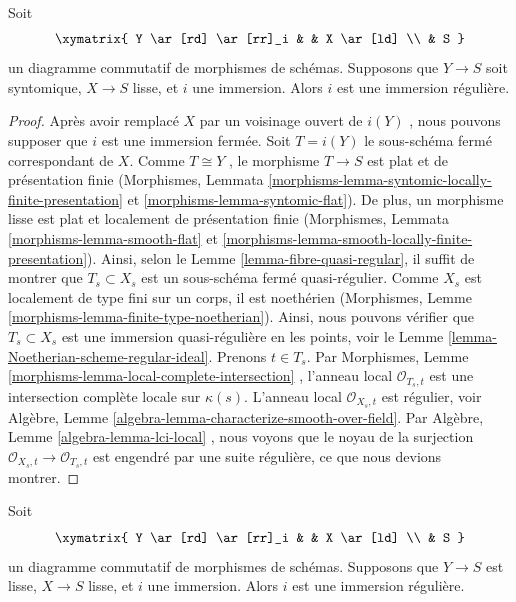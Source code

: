\begin{lemma}
\label{lemma-immersion-lci-into-smooth-regular-immersion}
Soit
$$
\xymatrix{
Y \ar[rd] \ar[rr]_i & & X \ar[ld] \\
& S
}
$$
un diagramme commutatif de morphismes de schémas. Supposons que  $Y \to S$  soit
syntomique,  $X \to S$  lisse, et  $i$  une immersion. Alors  $i$ 
est une immersion régulière.
\end{lemma}

\begin{proof}
Après avoir remplacé  $X$  par un voisinage ouvert de  $i(Y)$ , nous
pouvons supposer que  $i$  est une immersion fermée. Soit  $T = i(Y)$  le
sous-schéma fermé correspondant de  $X$. Comme  $T \cong Y$ , le morphisme
 $T \to S$  est plat et de présentation finie (Morphismes, Lemmata  \ref{morphisms-lemma-syntomic-locally-finite-presentation} 
et  \ref{morphisms-lemma-syntomic-flat}). De plus, un morphisme lisse est plat et localement de
présentation finie (Morphismes, Lemmata  \ref{morphisms-lemma-smooth-flat}  et  \ref{morphisms-lemma-smooth-locally-finite-presentation}). Ainsi,
selon le Lemme  \ref{lemma-fibre-quasi-regular}, il suffit de montrer que  $T_s \subset X_s$  est un
sous-schéma fermé quasi-régulier. Comme  $X_s$  est localement de type fini
sur un corps, il est noethérien (Morphismes, Lemme  \ref{morphisms-lemma-finite-type-noetherian}). Ainsi, nous
pouvons vérifier que  $T_s \subset X_s$  est une immersion quasi-régulière en les points,
voir le Lemme  \ref{lemma-Noetherian-scheme-regular-ideal}. Prenons  $t \in T_s$. Par Morphismes, Lemme  \ref{morphisms-lemma-local-complete-intersection} ,
l'anneau local  $\mathcal{O}_{T_s, t}$  est une intersection complète locale sur  $\kappa(s)$.
L'anneau local  $\mathcal{O}_{X_s, t}$  est régulier, voir Algèbre, Lemme  \ref{algebra-lemma-characterize-smooth-over-field}. Par
Algèbre, Lemme  \ref{algebra-lemma-lci-local} , nous voyons que le noyau de la surjection
 $\mathcal{O}_{X_s, t} \to \mathcal{O}_{T_s, t}$  est engendré par une suite régulière, ce que nous devions montrer.
\end{proof}

\begin{lemma}
\label{lemma-immersion-smooth-into-smooth-regular-immersion}
Soit
$$
\xymatrix{
Y \ar[rd] \ar[rr]_i & & X \ar[ld] \\
& S
}
$$
un diagramme commutatif de morphismes de schémas. Supposons que  $Y \to S$  est
lisse,  $X \to S$  lisse, et  $i$  une immersion. Alors  $i$  est
une immersion régulière.
\end{lemma}

